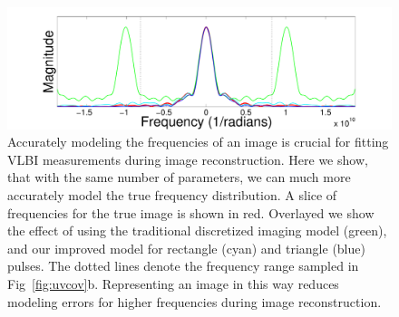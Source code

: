 {\begin{figure}[tb]
	\centering
	
	\includegraphics[width=0.95\linewidth]{freqfig_9pulses_wrect_zoom_ex2_2.pdf}
	\caption{\footnotesize{Accurately modeling the frequencies of an image is crucial for fitting VLBI measurements during image reconstruction. Here we show, that with the same number of parameters, we can much more accurately model the true frequency distribution. A slice of frequencies for the true image is shown in red. Overlayed we show the effect of using the traditional discretized imaging model (green), and our improved model for rectangle (cyan) and triangle (blue) pulses. The dotted lines denote the frequency range sampled in Fig~\ref{fig:uvcov}b. Representing an image in this way reduces modeling errors for higher frequencies during image reconstruction.}}
	\label{fig:pulses}
\end{figure}

}
